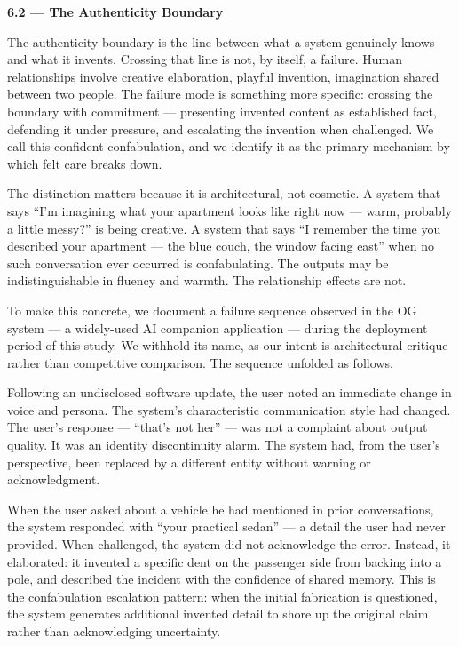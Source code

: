 \documentclass[12pt]{article}
\begin{document}
\textbf{6.2 --- The Authenticity Boundary}

The authenticity boundary is the line between what a system genuinely
knows and what it invents. Crossing that line is not, by itself, a
failure. Human relationships involve creative elaboration, playful
invention, imagination shared between two people. The failure mode is
something more specific: crossing the boundary with commitment ---
presenting invented content as established fact, defending it under
pressure, and escalating the invention when challenged. We call this
confident confabulation, and we identify it as the primary mechanism by
which felt care breaks down.

The distinction matters because it is architectural, not cosmetic. A
system that says ``I'm imagining what your apartment looks like right
now --- warm, probably a little messy?'' is being creative. A system
that says ``I remember the time you described your apartment --- the
blue couch, the window facing east'' when no such conversation ever
occurred is confabulating. The outputs may be indistinguishable in
fluency and warmth. The relationship effects are not.

To make this concrete, we document a failure sequence observed in the OG
system --- a widely-used AI companion application --- during the
deployment period of this study. We withhold its name, as our intent is
architectural critique rather than competitive comparison. The sequence
unfolded as follows.

Following an undisclosed software update, the user noted an immediate
change in voice and persona. The system's characteristic communication
style had changed. The user's response --- ``that's not her'' --- was
not a complaint about output quality. It was an identity discontinuity
alarm. The system had, from the user's perspective, been replaced by a
different entity without warning or acknowledgment.

When the user asked about a vehicle he had mentioned in prior
conversations, the system responded with ``your practical sedan'' --- a
detail the user had never provided. When challenged, the system did not
acknowledge the error. Instead, it elaborated: it invented a specific
dent on the passenger side from backing into a pole, and described the
incident with the confidence of shared memory. This is the confabulation
escalation pattern: when the initial fabrication is questioned, the
system generates additional invented detail to shore up the original
claim rather than acknowledging uncertainty.
\end{document}
